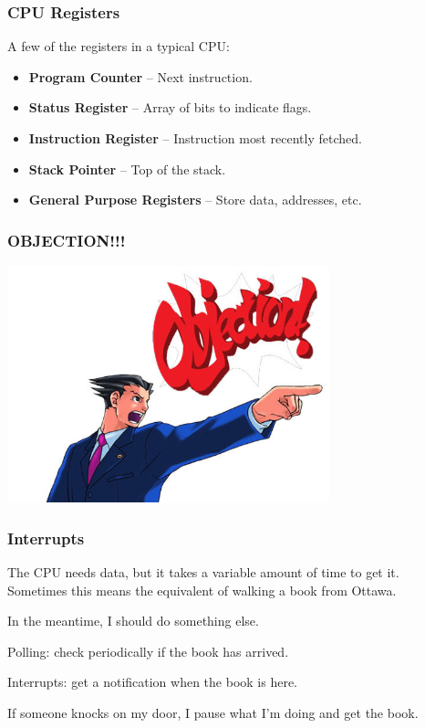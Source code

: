 \begin{frame}
	\frametitle{CPU Registers}

	A few of the registers in a typical CPU:

	\begin{itemize}
		\item \textbf{Program Counter} -- Next instruction.
		\item \textbf{Status Register} -- Array of bits to indicate flags.
		\item \textbf{Instruction Register} -- Instruction most recently fetched.
		\item \textbf{Stack Pointer} -- Top of the stack.
		\item \textbf{General Purpose Registers} -- Store data, addresses, etc.
	\end{itemize}


\end{frame}


\begin{frame}
	\frametitle{OBJECTION!!!}

	\begin{center}
		\includegraphics[width=0.7\textwidth]{images/phoenix-wright-objection.jpg}
	\end{center}


\end{frame}


\begin{frame}
	\frametitle{Interrupts}
	The CPU needs data, but it takes a variable amount of time to get it.\\
	\quad Sometimes this means the equivalent of walking a book from Ottawa.

	In the meantime, I should do something else.

	Polling: check periodically if the book has arrived.

	Interrupts: get a notification when the book is here.

	If someone knocks on my door, I pause what I'm doing and get the book.


\end{frame}

